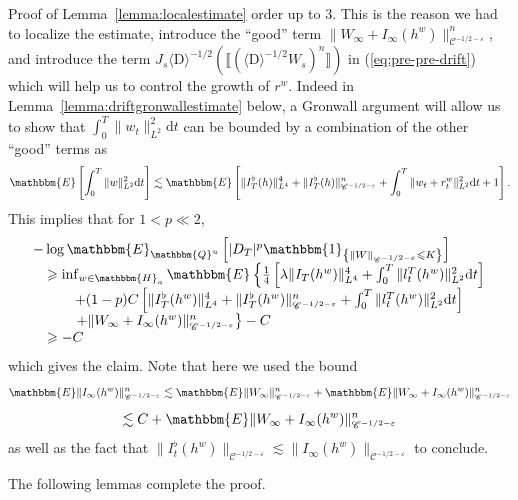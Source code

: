 \documentclass[11pt]{article}
\newcommand{\mathD}{\mathrm{D}}
\newcommand{\mathd}{\mathrm{d}}
\newenvironment{proof*}[1]{\noindent\textbf{#1\ }}{\hspace*{\fill}$\Box$\medskip}
\newcommand{\VV}{\mathscr{C}}
\begin{document}
\begin{proof*}{Proof of Lemma~\ref{lemma:localestimate}}
  order up to $3$. This is the reason we had to localize the estimate,
  introduce the ``good'' term $\| W_{\infty} + I_{\infty} (h^w) \|^n_{\VV^{- 1
  / 2 - \varepsilon}}$, and introduce the term $J_s \langle \mathD \rangle^{-
  1 / 2} (\llbracket (\langle \mathD \rangle^{- 1 / 2} W_s)^n \rrbracket)$ in
  (\ref{eq:pre-pre-drift}) which will help us to control the growth of $r^w$.
  Indeed in Lemma~\ref{lemma:driftgronwallestimate} below, a Gronwall argument
  will allow us to show that $\int^T_0 \| w_t \|^2_{L^2} \mathd t$ can be
  bounded by a combination of the other ``good'' terms as
  \[ \mathbbm{E} \left[ \int^T_0 \| w \|^2_{L^2} \mathd t \right] \lesssim
     \mathbbm{E} \left[ \| I^{\flat}_T (h) \|^4_{L^4} + \| I_T^{\flat} (h)
     \|^n_{\VV^{- 1 / 2 - \varepsilon}} + \int^T_0 \| w_t + r_t^w \|_{L^2}^2
     \mathd t + 1 \right] . \]
  This implies that for $1 < p \ll 2$,
  \[ \begin{array}{l}
       - \log \mathbbm{E}_{\mathbbm{Q}^u} \left[ | D_T |^p
       \mathbbm{1}_{\left\{ \| W \|_{\VV^{- 1 / 2 - \varepsilon}} \leqslant K
       \right\}} \right]\\
       \quad \geqslant \inf_{w \in \mathbbm{H}_a} \mathbbm{E} \left\{
       \frac{1}{4} \left[ \lambda \| I_T (h^w) \|^4_{L^4} + \int^T_0 \| l^T_t
       (h^w) \|_{L^2}^2 \mathd t \right] \right.\\
       \quad \quad \quad + (1 - p) C \left[ \| I^{\flat}_T (h^w) \|^4_{L^4} +
       \| I_T^{\flat} (h^w) \|^n_{\VV^{- 1 / 2 - \varepsilon}} + \int^T_0 \|
       l^T_t (h^w) \|_{L^2}^2 \mathd t \right]\\
       \quad \quad \quad \left. + \| W_{\infty} + I_{\infty} (h^w)
       \|^n_{\VV^{- 1 / 2 - \varepsilon}} \right\} - C\\
       \quad \geqslant - C
     \end{array} \]
  which gives the claim. Note that here we used the bound
  \[ \mathbbm{E} \| I_{\infty} (h^w) \|^n_{\VV^{- 1 / 2 - \varepsilon}}
     \lesssim \mathbbm{E} \| W_{\infty} \|^n_{\VV^{- 1 / 2 - \varepsilon}}
     +\mathbbm{E} \| W_{\infty} + I_{\infty} (h^w) \|^n_{\VV^{- 1 / 2 -
     \varepsilon}} \]
  \[ \lesssim C +\mathbbm{E} \| W_{\infty} + I_{\infty} (h^w) \|^n_{\VV^{- 1 /
     2 - \varepsilon}} \]
  as well as the fact that $\| I^{\flat}_t (h^w) \|_{\VV^{- 1 / 2 -
  \varepsilon}} \lesssim \| I_{\infty} (h^w) \|_{\VV^{- 1 / 2 - \varepsilon}}$
  to conclude.
\end{proof*}

The following lemmas complete the proof.
\end{document}
